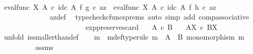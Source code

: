 \begin{isabellebody}
\ \ \ \ \ \ \ \ \ \ \isamarkupfalse%
\ \isamarkupfalse%
\ {\isachardoublequoteopen}{\isacharparenleft}{\kern0pt}eval{\isacharunderscore}{\kern0pt}func\ X\ A\ {\isasymcirc}\isactrlsub c\ id\isactrlsub c\ A\ {\isasymtimes}\isactrlsub f\ g{\isacharparenright}{\kern0pt}\ {\isasymcirc}\isactrlsub c\ az\ {\isacharequal}{\kern0pt}\ {\isacharparenleft}{\kern0pt}eval{\isacharunderscore}{\kern0pt}func\ X\ A\ {\isasymcirc}\isactrlsub c\ id\isactrlsub c\ A\ {\isasymtimes}\isactrlsub f\ h{\isacharparenright}{\kern0pt}\ {\isasymcirc}\isactrlsub c\ az{\isachardoublequoteclose}\isanewline
\ \ \ \ \ \ \ \ \ \ \ \ \isamarkupfalse%
\ az{\isacharunderscore}{\kern0pt}def\ \isamarkupfalse%
\ {\isacharparenleft}{\kern0pt}typecheck{\isacharunderscore}{\kern0pt}cfuncs{\isacharunderscore}{\kern0pt}prems{\isacharcomma}{\kern0pt}\ auto\ simp\ add{\isacharcolon}{\kern0pt}\ comp{\isacharunderscore}{\kern0pt}associative{}{\isacharparenright}{\kern0pt}\isanewline
\ \ \ \ \ \ \ \ \isamarkupfalse%
\isanewline
\ \ \ \ \ \ \isamarkupfalse%
\isanewline
\ \ \ \ \isamarkupfalse%
\isanewline
\ \ \isamarkupfalse%
\isanewline
{}\isamarkupfalse%
%
\endisatagproof
{\isafoldproof}%
%
\isadelimproof
\isanewline
%
\endisadelimproof
\isanewline
{}\isamarkupfalse%
\ exp{\isacharunderscore}{\kern0pt}preserves{\isacharunderscore}{\kern0pt}card{}{\isacharcolon}{\kern0pt}\isanewline
\ \ \ {\isachardoublequoteopen}A\ {\isasymle}\isactrlsub c\ B{\isachardoublequoteclose}\isanewline
\ \ \ {\isachardoublequoteopen}A\isactrlbsup X\isactrlesup \ {\isasymle}\isactrlsub c\ B\isactrlbsup X\isactrlesup {\isachardoublequoteclose}\isanewline
%
\isadelimproof
%
\endisadelimproof
%
\isatagproof
{}\isamarkupfalse%
\ {\isacharparenleft}{\kern0pt}unfold\ is{\isacharunderscore}{\kern0pt}smaller{\isacharunderscore}{\kern0pt}than{\isacharunderscore}{\kern0pt}def{\isacharparenright}{\kern0pt}\isanewline
\ \ \isamarkupfalse%
\ m\ \ m{\isacharunderscore}{\kern0pt}def{\isacharbrackleft}{\kern0pt}type{\isacharunderscore}{\kern0pt}rule{\isacharbrackright}{\kern0pt}{\isacharcolon}{\kern0pt}\ {\isachardoublequoteopen}m\ {\isacharcolon}{\kern0pt}\ A\ {\isasymrightarrow}\ B{\isachardoublequoteclose}\ {\isachardoublequoteopen}monomorphism\ m{\isachardoublequoteclose}\isanewline
\ \ \ \ \ \ \ \ \isamarkupfalse%
\ assms\ \isamarkupfalse%

\end{isabellebody}
